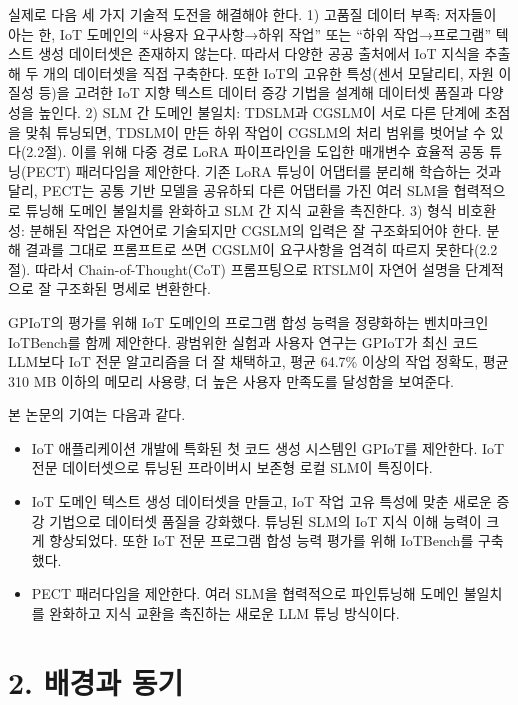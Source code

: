 \documentclass[sigconf,nonacm]{acmart}
\begin{document}
실제로 다음 세 가지 기술적 도전을 해결해야 한다. 1) 고품질 데이터 부족: 저자들이 아는 한, IoT 도메인의 ``사용자 요구사항→하위 작업'' 또는 ``하위 작업→프로그램'' 텍스트 생성 데이터셋은 존재하지 않는다. 따라서 다양한 공공 출처에서 IoT 지식을 추출해 두 개의 데이터셋을 직접 구축한다. 또한 IoT의 고유한 특성(센서 모달리티, 자원 이질성 등)을 고려한 IoT 지향 텍스트 데이터 증강 기법을 설계해 데이터셋 품질과 다양성을 높인다. 2) SLM 간 도메인 불일치: TDSLM과 CGSLM이 서로 다른 단계에 초점을 맞춰 튜닝되면, TDSLM이 만든 하위 작업이 CGSLM의 처리 범위를 벗어날 수 있다(2.2절). 이를 위해 다중 경로 LoRA 파이프라인을 도입한 매개변수 효율적 공동 튜닝(PECT) 패러다임을 제안한다. 기존 LoRA 튜닝이 어댑터를 분리해 학습하는 것과 달리, PECT는 공통 기반 모델을 공유하되 다른 어댑터를 가진 여러 SLM을 협력적으로 튜닝해 도메인 불일치를 완화하고 SLM 간 지식 교환을 촉진한다. 3) 형식 비호환성: 분해된 작업은 자연어로 기술되지만 CGSLM의 입력은 잘 구조화되어야 한다. 분해 결과를 그대로 프롬프트로 쓰면 CGSLM이 요구사항을 엄격히 따르지 못한다(2.2절). 따라서 Chain-of-Thought(CoT) 프롬프팅으로 RTSLM이 자연어 설명을 단계적으로 잘 구조화된 명세로 변환한다.

GPIoT의 평가를 위해 IoT 도메인의 프로그램 합성 능력을 정량화하는 벤치마크인 IoTBench를 함께 제안한다. 광범위한 실험과 사용자 연구는 GPIoT가 최신 코드 LLM보다 IoT 전문 알고리즘을 더 잘 채택하고, 평균 64.7\% 이상의 작업 정확도, 평균 310 MB 이하의 메모리 사용량, 더 높은 사용자 만족도를 달성함을 보여준다.

본 논문의 기여는 다음과 같다.

\begin{itemize}
\item IoT 애플리케이션 개발에 특화된 첫 코드 생성 시스템인 GPIoT를 제안한다. IoT 전문 데이터셋으로 튜닝된 프라이버시 보존형 로컬 SLM이 특징이다.
\item IoT 도메인 텍스트 생성 데이터셋을 만들고, IoT 작업 고유 특성에 맞춘 새로운 증강 기법으로 데이터셋 품질을 강화했다. 튜닝된 SLM의 IoT 지식 이해 능력이 크게 향상되었다. 또한 IoT 전문 프로그램 합성 능력 평가를 위해 IoTBench를 구축했다.
\item PECT 패러다임을 제안한다. 여러 SLM을 협력적으로 파인튜닝해 도메인 불일치를 완화하고 지식 교환을 촉진하는 새로운 LLM 튜닝 방식이다.
\end{itemize}

\section{2. 배경과 동기}
\end{document}

